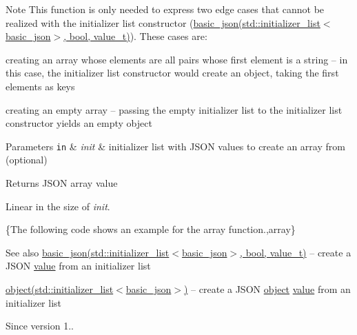 \begin{DoxyNote}{Note}
This function is only needed to express two edge cases that cannot be realized with the initializer list constructor (\hyperlink{a00025_afeb998aec45296bc2050bd1c41ef41eb}{basic\+\_\+json(std\+::initializer\+\_\+list$<$basic\+\_\+json$>$, bool, value\+\_\+t)}). These cases are\+:
\begin{DoxyEnumerate}
\item creating an array whose elements are all pairs whose first element is a string -- in this case, the initializer list constructor would create an object, taking the first elements as keys
\item creating an empty array -- passing the empty initializer list to the initializer list constructor yields an empty object
\end{DoxyEnumerate}
\end{DoxyNote}

\begin{DoxyParams}[1]{Parameters}
\mbox{\tt in}  & {\em init} & initializer list with J\+S\+ON values to create an array from (optional)\\
\hline
\end{DoxyParams}
\begin{DoxyReturn}{Returns}
J\+S\+ON array value
\end{DoxyReturn}
Linear in the size of {\itshape init}.

\{The following code shows an example for the {\ttfamily array} function.,array\}

\begin{DoxySeeAlso}{See also}
\hyperlink{a00025_afeb998aec45296bc2050bd1c41ef41eb}{basic\+\_\+json(std\+::initializer\+\_\+list$<$basic\+\_\+json$>$, bool, value\+\_\+t)} -- create a J\+S\+ON \hyperlink{a00025_a0a2cbbd95862a623e7dc5c37e67dead0}{value} from an initializer list 

\hyperlink{a00025_ad25b2f8c21e241e2d63455537a9294ff}{object(std\+::initializer\+\_\+list$<$basic\+\_\+json$>$)} -- create a J\+S\+ON \hyperlink{a00025_ad25b2f8c21e241e2d63455537a9294ff}{object} \hyperlink{a00025_a0a2cbbd95862a623e7dc5c37e67dead0}{value} from an initializer list
\end{DoxySeeAlso}
\begin{DoxySince}{Since}
version 1.. 
\end{DoxySince}
